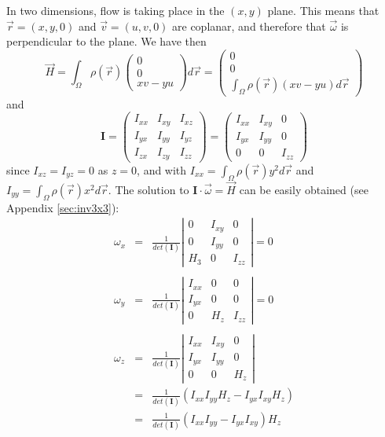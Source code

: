 In two dimensions, flow is taking place in the $(x,y)$ plane. 
This means that $\vec r=(x,y,0)$ and $\vec v=(u,v,0)$ are coplanar, 
and therefore that $\vec \omega$ is perpendicular to the plane.
We have then
\begin{equation}
\vec H = \int_\Omega \rho(\vec r) \left( 
\begin{array}{c} 
0 \\ 0 \\ xv-yu 
\end{array} \right) d\vec r
= 
\left(\begin{array}{c} 
0 \\ 0 \\
\int_\Omega \rho(\vec r) (xv-yu) d\vec r
\end{array} \right)
\end{equation}
and 
\begin{equation}
\bm I
=
\left(
\begin{array}{ccc}
I_{xx} & I_{xy} & I_{xz} \\
I_{yx} & I_{yy} & I_{yz} \\
I_{zx} & I_{zy} & I_{zz} 
\end{array}
\right)
=
\left(
\begin{array}{ccc}
I_{xx} & I_{xy} & 0 \\
I_{yx} & I_{yy} & 0 \\
0      & 0      & I_{zz} 
\end{array}
\right)
\end{equation}
since $I_{xz}=I_{yz}=0$ as $z=0$, and with 
$I_{xx}=\int_\Omega \rho(\vec r) y^2 d\vec r$ and 
$I_{yy}=\int_\Omega \rho(\vec r) x^2 d\vec r$.
The solution to ${\bm I}\cdot \vec \omega = \vec H$ can be easily obtained 
(see Appendix \ref{sec:inv3x3}):
\begin{eqnarray}
\omega_x
&=&
\frac{1}{det(\bm I)}
\left| 
\begin{array}{ccc}
0 & I_{xy} & 0 \\
0 & I_{yy} & 0 \\
H_3 & 0 & I_{zz} 
\end{array}
\right| = 0 \\ \nonumber\\
\omega_y
&=&
\frac{1}{det(\bm I)}
\left| 
\begin{array}{ccc}
I_{xx} & 0 & 0 \\
I_{yx} & 0 & 0 \\
0 & H_z & I_{zz} 
\end{array}
\right| = 0 \\ \nonumber\\ 
\omega_z
&=&
\frac{1}{det(\bm I)}
\left| 
\begin{array}{ccc}
I_{xx} & I_{xy} & 0\\
I_{yx} & I_{yy} & 0\\
0 & 0 & H_z
\end{array}
\right| \\
&=& \frac{1}{det(\bm I)} \left( I_{xx}I_{yy}H_z - I_{yx}I_{xy}H_z \right) \\
&=& \frac{1}{det(\bm I)} \left( I_{xx}I_{yy} - I_{yx}I_{xy} \right) H_z 
\end{eqnarray}
